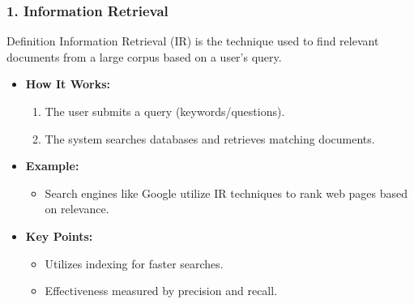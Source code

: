\documentclass[aspectratio=169]{beamer}
\begin{document}
\begin{frame}[fragile]
    \frametitle{1. Information Retrieval}
    \begin{block}{Definition}
        Information Retrieval (IR) is the technique used to find relevant documents from a large corpus based on a user's query.
    \end{block}
    \begin{itemize}
        \item \textbf{How It Works:}
        \begin{enumerate}
            \item The user submits a query (keywords/questions).
            \item The system searches databases and retrieves matching documents.
        \end{enumerate}
        \item \textbf{Example:} 
        \begin{itemize}
            \item Search engines like Google utilize IR techniques to rank web pages based on relevance.
        \end{itemize}
        \item \textbf{Key Points:}
        \begin{itemize}
            \item Utilizes indexing for faster searches.
            \item Effectiveness measured by precision and recall.
        \end{itemize}
    \end{itemize}
\end{frame}
\end{document}
